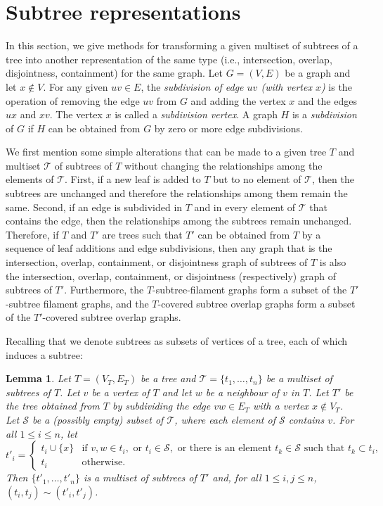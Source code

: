 \documentclass[
final
]{dmtcs-episciences}        \usepackage{graphics, amsthm, amsmath, amssymb, algorithm, algorithmic}
\newtheorem{lemma}{Lemma}
\begin{document}
\section{Subtree representations}


In this section, we give methods for transforming a given multiset of subtrees of a tree into another representation of the same type 
(i.e., intersection, overlap, disjointness, containment) 
for the same graph.
Let $G=(V,E)$ be a graph and let $x \notin V$. For any given $uv \in E$, 
the {\em subdivision of edge $uv$ (with vertex $x$)} is the operation of removing the edge $uv$ from $G$ and adding the vertex $x$ and the edges $ux$ and $xv$. The vertex $x$ is called a {\em subdivision vertex}. A graph $H$ is a \emph{subdivision} of $G$ if $H$ can be obtained from $G$ by zero or more edge subdivisions.  

We first mention some simple alterations that can be made to a given tree $T$ and multiset $\mathcal T$ of subtrees of $T$ without changing the relationships among the elements of $\mathcal T$.
First, if a new leaf is added to $T$ but to no element of $\mathcal T$, then the subtrees are unchanged and therefore the relationships among them remain the same. Second, if an edge is subdivided in $T$ and in every element of $\mathcal T$ that contains the edge, then the relationships among the subtrees remain unchanged.
Therefore, if $T$ and $T'$ are trees such that $T'$ can be obtained from $T$ by a sequence of leaf additions and edge subdivisions, then 
any graph that is the intersection, overlap, containment, or disjointness graph of subtrees of $T$ is also the 
intersection, overlap, containment, or disjointness (respectively) graph of subtrees of $T'$.
Furthermore,
the $T$-subtree-filament graphs form a subset of the $T'$-subtree filament graphs, and the $T$-covered subtree overlap graphs form a subset of the $T'$-covered subtree overlap graphs.


Recalling that we denote subtrees as subsets of vertices of a tree, each of which induces a subtree:
\begin{lemma} \label{lem:subdiv}
Let $T=(V_T, E_T)$ be a tree and $\mathcal{T} = \{ t_1, \ldots, t_n  \}$ be a multiset of subtrees of $T$. 
Let $v$ be a vertex of $T$ and let $w$ be a neighbour of $v$ in $T$.
Let $T'$ be the tree obtained from $T$ by 
subdividing the edge $vw \in E_T$ with a vertex $x \notin V_T$.
Let $\mathcal S$ be a (possibly empty) subset of $\mathcal T$, where each element of 
$\mathcal S$ contains $v$.  
For all $1 \le i \le n$, let
\[
t'_i = \left\{
\begin{array}{ll}
t_i \cup \{x\} & \mbox{if } v, w \in t_i, \mbox{ or } t_i \in \mathcal S, \mbox{ or there is an element } t_k \in \mathcal S \mbox{ such that } t_k \subset t_i,\\
t_i & \mbox{otherwise.}
\end{array}
\right.
\]
Then
$\{ t'_1, \ldots, t'_n \}$ is a multiset of subtrees of $T'$ and,
for all $1 \le i,j \le n$, $(t_i, t_j) \sim (t'_i, t'_j)$.
\end{lemma}
\end{document}
